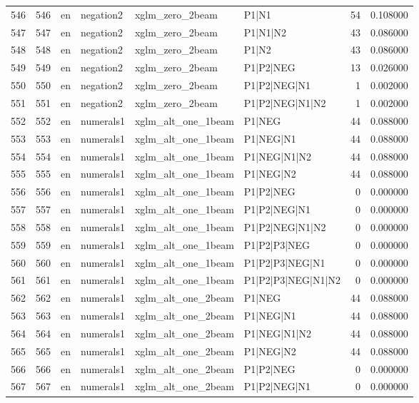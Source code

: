 \begin{tabular}{lrllllrr}
546 & 546 & en & negation2 & xglm_zero_2beam & P1|N1 & 54 & 0.108000 \\
547 & 547 & en & negation2 & xglm_zero_2beam & P1|N1|N2 & 43 & 0.086000 \\
548 & 548 & en & negation2 & xglm_zero_2beam & P1|N2 & 43 & 0.086000 \\
549 & 549 & en & negation2 & xglm_zero_2beam & P1|P2|NEG & 13 & 0.026000 \\
550 & 550 & en & negation2 & xglm_zero_2beam & P1|P2|NEG|N1 & 1 & 0.002000 \\
551 & 551 & en & negation2 & xglm_zero_2beam & P1|P2|NEG|N1|N2 & 1 & 0.002000 \\
552 & 552 & en & numerals1 & xglm_alt_one_1beam & P1|NEG & 44 & 0.088000 \\
553 & 553 & en & numerals1 & xglm_alt_one_1beam & P1|NEG|N1 & 44 & 0.088000 \\
554 & 554 & en & numerals1 & xglm_alt_one_1beam & P1|NEG|N1|N2 & 44 & 0.088000 \\
555 & 555 & en & numerals1 & xglm_alt_one_1beam & P1|NEG|N2 & 44 & 0.088000 \\
556 & 556 & en & numerals1 & xglm_alt_one_1beam & P1|P2|NEG & 0 & 0.000000 \\
557 & 557 & en & numerals1 & xglm_alt_one_1beam & P1|P2|NEG|N1 & 0 & 0.000000 \\
558 & 558 & en & numerals1 & xglm_alt_one_1beam & P1|P2|NEG|N1|N2 & 0 & 0.000000 \\
559 & 559 & en & numerals1 & xglm_alt_one_1beam & P1|P2|P3|NEG & 0 & 0.000000 \\
560 & 560 & en & numerals1 & xglm_alt_one_1beam & P1|P2|P3|NEG|N1 & 0 & 0.000000 \\
561 & 561 & en & numerals1 & xglm_alt_one_1beam & P1|P2|P3|NEG|N1|N2 & 0 & 0.000000 \\
562 & 562 & en & numerals1 & xglm_alt_one_2beam & P1|NEG & 44 & 0.088000 \\
563 & 563 & en & numerals1 & xglm_alt_one_2beam & P1|NEG|N1 & 44 & 0.088000 \\
564 & 564 & en & numerals1 & xglm_alt_one_2beam & P1|NEG|N1|N2 & 44 & 0.088000 \\
565 & 565 & en & numerals1 & xglm_alt_one_2beam & P1|NEG|N2 & 44 & 0.088000 \\
566 & 566 & en & numerals1 & xglm_alt_one_2beam & P1|P2|NEG & 0 & 0.000000 \\
567 & 567 & en & numerals1 & xglm_alt_one_2beam & P1|P2|NEG|N1 & 0 & 0.000000 \\

\end{tabular}
